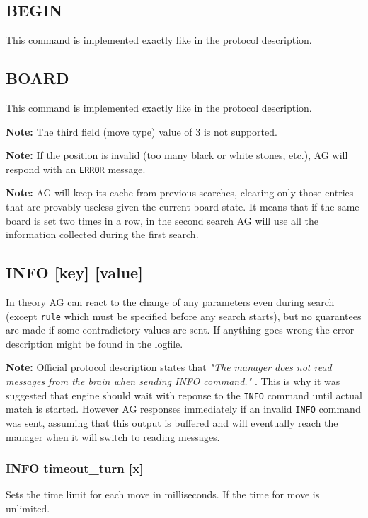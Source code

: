 \documentclass[12pt,a4paper]{article}
\begin{document}
\subsection{BEGIN}
\label{cmd_begin}
This command is implemented exactly like in the protocol description.


\subsection{BOARD}
\label{cmd_board}
This command is implemented exactly like in the protocol description.

\textbf{Note:} The third field (move type) value of 3 is not supported. 

\textbf{Note:} If the position is invalid (too many black or white stones, etc.), AG will respond with an \texttt{ERROR} message.

\textbf{Note:} AG will keep its cache from previous searches, clearing only those entries that are provably useless given the current board state. It means that if the same board is set two times in a row, in the second search AG will use all the information collected during the first search.


\subsection{INFO [key] [value]}
\label{cmd_info}
In theory AG can react to the change of any parameters even during search (except \texttt{rule} which must be specified before any search starts), but no guarantees are made if some contradictory values are sent. If anything goes wrong the error description might be found in the logfile.

\textbf{Note:} Official protocol description states that \textit{"The manager does not read messages from the brain when sending INFO command."} \cite{newprotocol}. This is why it was suggested that engine should wait with reponse to the \texttt{INFO} command until actual match is started. However AG responses immediately if an invalid \texttt{INFO} command was sent, assuming that this output is buffered and will eventually reach the manager when it will switch to reading messages.

\subsubsection{INFO timeout{\_}turn [x]}
\label{cmd_info_timeout_turn}
Sets the time limit for each move in milliseconds. If  the time for move is unlimited.
\end{document}
